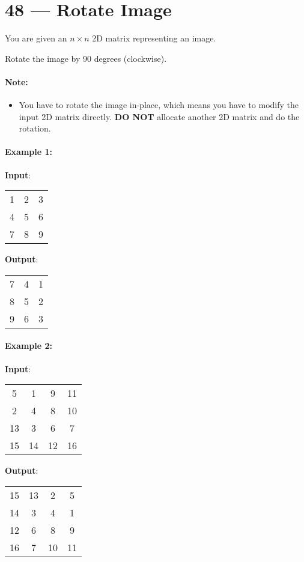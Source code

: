 \section{48 --- Rotate Image}
You are given an $n \times n$ 2D matrix representing an image.

Rotate the image by 90 degrees (clockwise).

\paragraph{Note:}

\begin{itemize}
\item You have to rotate the image in-place, which means you have to modify the input 2D matrix directly. \textbf{DO NOT} allocate another 2D matrix and do the rotation.
\end{itemize}

\paragraph{Example 1:}
\begin{flushleft}
\textbf{Input}:
\begin{table}[H]
\begin{tabular}{ccc}
1 & 2 & 3\\
4 & 5 & 6\\
7 & 8 & 9
\end{tabular}
\end{table}
\textbf{Output}:
\begin{table}[H]
\begin{tabular}{ccc}
7 & 4 & 1\\
8 & 5 & 2\\
9 & 6 & 3
\end{tabular}
\end{table}
\end{flushleft}

\paragraph{Example 2:}
\begin{flushleft}
\textbf{Input}:
\begin{table}[H]
\begin{tabular}{cccc}
5 &  1 &  9 & 11\\
2 &  4 &  8 & 10\\
13 &  3 &  6 &  7\\
15 & 14 & 12 & 16
\end{tabular}
\end{table}
\textbf{Output}:
\begin{table}[H]
\begin{tabular}{cccc}
15 & 13 &  2 &  5\\
14 &  3 &  4 &  1\\
12 &  6 &  8 &  9\\
16 &  7 & 10 & 11
\end{tabular}
\end{table}
\end{flushleft}

